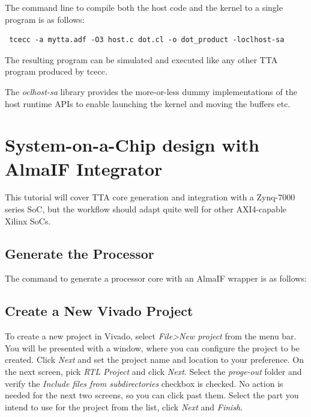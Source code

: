\documentclass[twoside]{tceusermanual}
\begin{document}
The command line to compile both the host code and the kernel to
a single program is as follows:

\begin{verbatim}
 tcecc -a mytta.adf -O3 host.c dot.cl -o dot_product -loclhost-sa
\end{verbatim}

The resulting program can be simulated and executed like any 
other TTA program produced by tcecc.

The \textit{oclhost-sa} library provides the more-or-less dummy
implementations of the host runtime APIs to enable launching the
kernel and moving the buffers etc.

\section{System-on-a-Chip design with AlmaIF Integrator}


This tutorial will cover TTA core generation and integration with a Zynq-7000
series SoC, but the workflow should adapt quite well for other AXI4-capable
Xilinx SoCs.


\subsection{Generate the Processor}

The command to generate a processor core with an AlmaIF wrapper is as follows:



\subsection{Create a New Vivado Project}

To create a new project in Vivado, select \textit{File>New project} from the
menu bar. You will be presented with a window, where you can configure the
project to be created. Click \textit{Next} and set the project name and location
to your preference. On the next screen, pick \textit{RTL Project} and click
\textit{Next}. Select the \textit{proge-out} folder and verify the
\textit{Include files from subdirectories} checkbox is checked. No action is
needed for the next two screens, so you can click past them. Select the part
you intend to use for the project from the list, click \textit{Next} and
\textit{Finish}.
\end{document}
